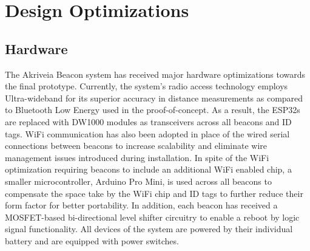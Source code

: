 

\setcounter{section}{1}
\section{Design Optimizations}
\bigskip

\subsection{Hardware}
The Akriveia Beacon system has received major hardware optimizations towards the final prototype. Currently, the system's radio access technology employs Ultra-wideband for its superior accuracy in distance measurements as compared to Bluetooth Low Energy used in the proof-of-concept. As a result, the ESP32s are replaced with DW1000 modules as transceivers across all beacons and ID tags. WiFi communication has also been adopted in place of the wired serial connections between beacons to increase scalability and eliminate wire management issues introduced during installation. In spite of the WiFi optimization requiring beacons to include an additional WiFi enabled chip, a smaller microcontroller, Arduino Pro Mini, is used across all beacons to compensate the space take by the WiFi chip and ID tags to further reduce their form factor for better portability. In addition, each beacon has received a MOSFET-based bi-directional level shifter circuitry to enable a reboot by logic signal functionality. All devices of the system are powered by their individual battery and are equipped with power switches.